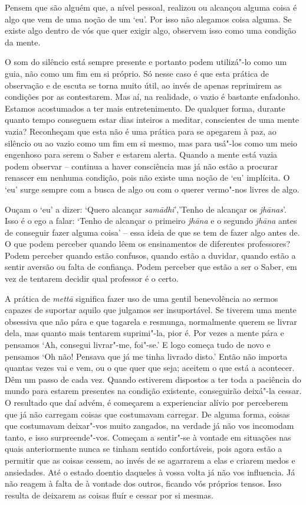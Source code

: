 Pensem que são alguém que, a nível pessoal, realizou ou alcançou alguma
coisa é algo que vem de uma noção de um `eu'. Por isso não alegamos
coisa alguma. Se existe algo dentro de vós que quer exigir algo,
observem isso como uma condição da mente.

O som do silêncio está sempre presente e portanto podem utilizá"-lo como
um guia, não como um fim em si próprio. Só nesse caso é que esta prática
de observação e de escuta se torna muito útil, ao invés de apenas
reprimirem as condições por as contestarem. Mas aí, na realidade, o vazio é
bastante enfadonho. Estamos acostumados a ter mais entretenimento. De
qualquer forma, durante quanto tempo conseguem estar dias inteiros a
meditar, conscientes de uma mente vazia? Reconheçam que esta não é uma
prática para se apegarem à paz, ao silêncio ou ao vazio como um fim em
si mesmo, mas para usá"-los como um meio engenhoso para serem o Saber e
estarem alerta. Quando a mente está vazia podem observar -- continua a
haver consciência mas já não estão a procurar renascer em nenhuma
condição, pois não existe uma noção de `eu' implícita. O `eu' surge
sempre com a busca de algo ou com o querer vermo"-nos livres de algo.

Ouçam o `eu' a dizer: `Quero alcançar \emph{samādhi}','Tenho de alcançar
os \emph{jhānas}'. Isso é o ego a falar: `Tenho de alcançar o primeiro
\emph{jhāna} e o segundo \emph{jhāna} antes de conseguir fazer alguma
coisa' -- essa ideia de que se tem de fazer algo antes de. O que podem
perceber quando lêem os ensinamentos de diferentes professores? Podem perceber
quando estão confusos, quando estão a duvidar, quando estão a sentir
aversão ou falta de confiança. Podem perceber que estão a ser o Saber, em
vez de tentarem decidir qual professor é o certo.

A prática de \emph{mettā} significa fazer uso de uma gentil benevolência
ao sermos capazes de suportar aquilo que julgamos ser insuportável. Se
tiverem uma mente obsessiva que não pára e que tagarela e resmunga,
normalmente querem se livrar dela, mas quanto mais tentarem
suprimi"-la, pior é. Por vezes a mente pára e pensamos `Ah, consegui
livrar"-me, foi"-se.' E logo começa tudo de novo e pensamos `Oh não!
Pensava que já me tinha livrado disto.' Então não importa quantas vezes
vai e vem, ou o que quer que seja; aceitem o que está a acontecer. Dêm
um passo de cada vez. Quando estiverem dispostos a ter toda a paciência
do mundo para estarem presentes na condição existente, conseguirão
deixá"-la cessar. O resultado que daí advém, é começarem a experienciar
alívio por perceberem que já não carregam coisas que costumavam
carregar. De alguma forma, coisas que costumavam deixar"-vos muito
zangados, na verdade já não vos incomodam tanto, e isso surpreende"-vos.
Começam a sentir"-se à vontade em situações nas quais anteriormente nunca
se tinham sentido confortáveis, pois agora estão a permitir que as
coisas cessem, ao invés de se agarrarem a elas e criarem medos e
ansiedades. Até o estado doentio daqueles à vossa volta já não vos
influencia. Já não reagem à falta de à vontade dos outros, ficando vós
próprios tensos. Isso resulta de deixarem as coisas fluír e cessar
por si mesmas.


